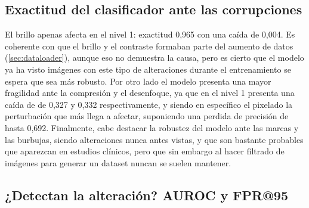 \subsection{Exactitud del clasificador ante las corrupciones}\label{sec:ood-corr-exactitud}


%

 El brillo apenas afecta en el nivel 1: exactitud 0,965 con una caída de
   0,004. Es coherente con que el brillo y el contraste formaban parte del aumento de datos
   (\cref{sec:dataloader}), aunque eso no demuestra la causa, pero es cierto que el modelo ya ha visto imágenes con este tipo de 
   alteraciones durante el entrenamiento se espera que sea más robusto.
 Por otro lado el modelo presenta una mayor fragilidad ante la compresión y el desenfoque, ya que en el nivel 1 presenta una caída de 
 de 0,327  y 0,332 respectivamente, y siendo en específico el pixelado la perturbación que más llega a afectar, suponiendo una perdida de precisión de hasta 0,692.
  Finalmente, cabe destacar la robustez del modelo ante las marcas y las burbujas, siendo alteraciones nunca antes vistas, y que son bastante probables 
  que aparezcan en estudios clínicos, pero que sin embargo al hacer filtrado de imágenes para generar un dataset nuncan se suelen mantener. ~\cite{schomig2021}

\subsection{¿Detectan la alteración? AUROC y FPR@95}\label{sec:ood-corr-deteccion}




